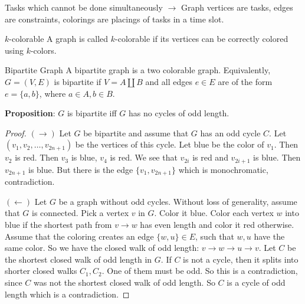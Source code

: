 \documentclass{report}
\begin{document}
\begin{examples}
    \begin{example}
        \begin{fixedfigure}
        \end{fixedfigure}
    \end{example}
\end{examples}

Tasks which cannot be done simultaneously $\rightarrow$ Graph vertices are tasks, edges are constraints, colorings are placings of tasks in a time slot.

\begin{definition}{$k$-colorable}
    A graph is called $k$-colorable if its vertices can be correctly colored using $k$-colors.
\end{definition}

\begin{definition}{Bipartite Graph}
    A bipartite graph is a two colorable graph. Equivalently, $G = (V, E)$ is bipartite if $V = A \coprod B$ and all edges $e \in E$ are of the form $e = \{a, b\}$, where $a \in A, b \in B$.
\end{definition}

\textbf{Proposition}: $G$ is bipartite iff $G$ has no cycles of odd length.
    \begin{proof}
        $(\rightarrow)$ Let $G$ be bipartite and assume that $G$ has an odd cycle $C$. Let $(v_{1}, v_{2}, \ldots, v_{2n + 1})$ be the vertices of this cycle. Let blue be the color of $v_{1}$. Then $v_{2}$ is red. Then $v_{3}$ is blue, $v_{4}$ is red. We see that $v_{2i}$ is red and $v_{2i + 1}$ is blue. Then $v_{2n + 1}$ is blue. But there is the edge $\{v_{1}, v_{2n + 1}\}$ which is monochromatic, contradiction.

        $(\leftarrow)$ Let $G$ be a graph without odd cycles. Without loss of generality, assume that $G$ is connected. Pick a vertex $v$ in $G$. Color it blue. Color each vertex $w$ into blue if the shortest path from $v \rightarrow w$ has even length and color it red otherwise. Assume that the coloring creates an edge $\{w, u\} \in E$, such that $w, u$ have the same color. So we have the closed walk of odd length: $v \rightarrow w \rightarrow u \rightarrow v$. Let $C$ be the shortest closed walk of odd length in $G$. If $C$ is not a cycle, then it splits into shorter closed walks $C_{1}, C_{2}$. One of them must be odd. So this is a contradiction, since $C$ was not the shortest closed walk of odd length. So $C$ is a cycle of odd length which is a contradiction.
    \end{proof}
\end{document}
